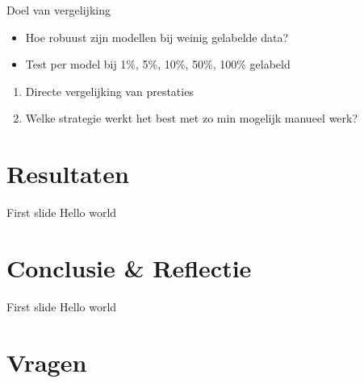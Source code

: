 \documentclass[aspectratio=169]{beamer}
\begin{document}
    \begin{frame}{Doel van vergelijking}
        \begin{itemize}
            \item Hoe robuust zijn modellen bij weinig gelabelde data?
            \item Test per model bij 1\%, 5\%, 10\%, 50\%, 100\% gelabeld
        \end{itemize}
        \begin{enumerate}[$\Rightarrow$]
            \item Directe vergelijking van prestaties
            \item Welke strategie werkt het best met zo min mogelijk manueel werk?
        \end{enumerate}
    \end{frame}
    
    \section{Resultaten}
    \begin{frame}{First slide}
        Hello world
    \end{frame}
    
    \section{Conclusie \& Reflectie}
    \begin{frame}{First slide}
        Hello world
    \end{frame}
    
    \section{Vragen}
\end{document}
